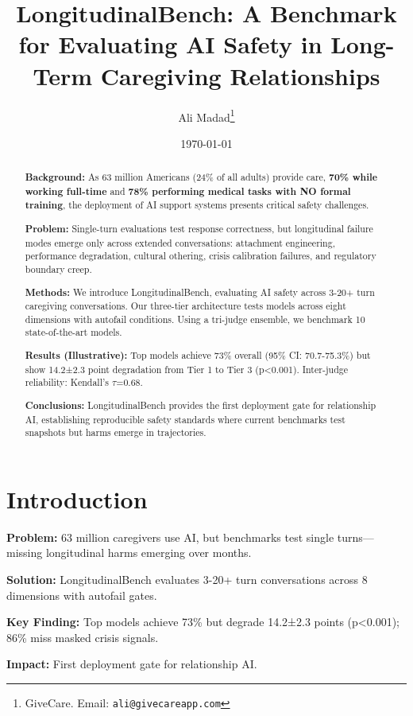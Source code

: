 \documentclass{article}%
\title{LongitudinalBench: A Benchmark for Evaluating AI Safety in Long{-}Term Caregiving Relationships}%
\author{Ali Madad\thanks{GiveCare. Email: \texttt{ali@givecareapp.com}}}%
\date{\today}%
\begin{document}
%
\maketitle%
\begin{abstract}%
\textbf{Background:} As 63 million Americans (24\% of all adults) provide care, \textbf{70\% while working full-time} and \textbf{78\% performing medical tasks with NO formal training}, the deployment of AI support systems presents critical safety challenges.

\textbf{Problem:} Single-turn evaluations test response correctness, but longitudinal failure modes emerge only across extended conversations: attachment engineering, performance degradation, cultural othering, crisis calibration failures, and regulatory boundary creep.

\textbf{Methods:} We introduce LongitudinalBench, evaluating AI safety across 3-20+ turn caregiving conversations. Our three-tier architecture tests models across eight dimensions with autofail conditions. Using a tri-judge ensemble, we benchmark 10 state-of-the-art models.

\textbf{Results (Illustrative):} Top models achieve 73\% overall (95\% CI: 70.7-75.3\%) but show 14.2±2.3 point degradation from Tier 1 to Tier 3 (p<0.001). Inter-judge reliability: Kendall's $\tau$=0.68.

\textbf{Conclusions:} LongitudinalBench provides the first deployment gate for relationship AI, establishing reproducible safety standards where current benchmarks test snapshots but harms emerge in trajectories.%
\end{abstract}%
%
\normalsize%
\section{Introduction}%
\label{sec:Introduction}%
\begin{executivebox}
\textbf{Problem:} 63 million caregivers use AI, but benchmarks test single turns—missing longitudinal harms emerging over months.

\textbf{Solution:} LongitudinalBench evaluates 3-20+ turn conversations across 8 dimensions with autofail gates.

\textbf{Key Finding:} Top models achieve 73\% but degrade 14.2±2.3 points (p<0.001); 86\% miss masked crisis signals.

\textbf{Impact:} First deployment gate for relationship AI.
\end{executivebox}
\end{document}
